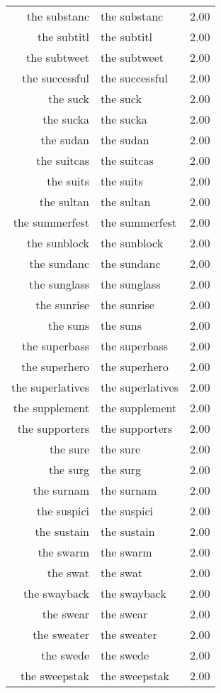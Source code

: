 \begin{table}[ht]
\begin{tabular}{rlr}
  the substanc & the substanc & 2.00 \\ 
  the subtitl & the subtitl & 2.00 \\ 
  the subtweet & the subtweet & 2.00 \\ 
  the successful & the successful & 2.00 \\ 
  the suck & the suck & 2.00 \\ 
  the sucka & the sucka & 2.00 \\ 
  the sudan & the sudan & 2.00 \\ 
  the suitcas & the suitcas & 2.00 \\ 
  the suits & the suits & 2.00 \\ 
  the sultan & the sultan & 2.00 \\ 
  the summerfest & the summerfest & 2.00 \\ 
  the sunblock & the sunblock & 2.00 \\ 
  the sundanc & the sundanc & 2.00 \\ 
  the sunglass & the sunglass & 2.00 \\ 
  the sunrise & the sunrise & 2.00 \\ 
  the suns & the suns & 2.00 \\ 
  the superbass & the superbass & 2.00 \\ 
  the superhero & the superhero & 2.00 \\ 
  the superlatives & the superlatives & 2.00 \\ 
  the supplement & the supplement & 2.00 \\ 
  the supporters & the supporters & 2.00 \\ 
  the sure & the sure & 2.00 \\ 
  the surg & the surg & 2.00 \\ 
  the surnam & the surnam & 2.00 \\ 
  the suspici & the suspici & 2.00 \\ 
  the sustain & the sustain & 2.00 \\ 
  the swarm & the swarm & 2.00 \\ 
  the swat & the swat & 2.00 \\ 
  the swayback & the swayback & 2.00 \\ 
  the swear & the swear & 2.00 \\ 
  the sweater & the sweater & 2.00 \\ 
  the swede & the swede & 2.00 \\ 
  the sweepstak & the sweepstak & 2.00 \\ 

\end{tabular}
\end{table}
